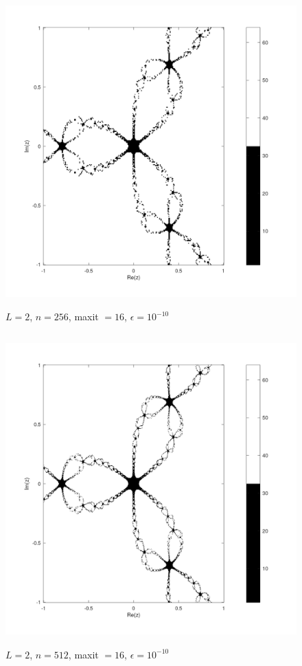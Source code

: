 \documentclass{article} %
\begin{document}
\begin{figure}[H]
    \centering
    \includegraphics[width=152mm, height=120mm]{images/L2n256maxit16e10-10.png}
    \caption{$L=2$, $n=256$, maxit $=16$, $\epsilon=10^{-10}$}
\end{figure}

\begin{figure}[H]
    \centering
    \includegraphics[width=152mm, height=120mm]{images/L2n512maxit16e10-10.png}
    \caption{$L=2$, $n=512$, maxit $=16$, $\epsilon=10^{-10}$}
\end{figure}
\end{document}
